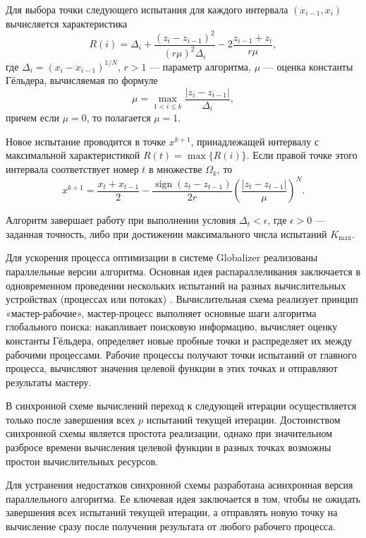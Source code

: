 \documentclass[11pt, oneside, a4paper]{article}
\begin{document}
Для выбора точки следующего испытания для каждого интервала $(x_{i-1}, x_i)$ вычисляется характеристика
\begin{equation}
R(i) = \Delta_i + \frac{(z_i - z_{i-1})^2}{(r\mu)^2\Delta_i} - 2\frac{z_{i-1} + z_i}{r\mu}, \label{eq_R}
\end{equation}
где $\Delta_i = (x_i - x_{i-1})^{1/N}$, $r>1$ --- параметр алгоритма, $\mu$ --- оценка константы Гёльдера, вычисляемая по формуле
\[
\mu = \max_{1 < i \leq k} \frac{|z_i - z_{i-1}|}{\Delta_i},
\]
причем если $\mu = 0$, то полагается $\mu = 1$.

Новое испытание проводится в точке $x^{k+1}$, принадлежащей интервалу с максимальной характеристикой $R(t) = \max\{R(i)\}$. Если правой точке этого интервала соответствует номер $t$ в множестве $\Omega_k$, то
\begin{equation}
x^{k+1} = \frac{x_t + x_{t-1}}{2} - \frac{\operatorname{sign}(z_t - z_{t-1})}{2r} \left( \frac{|z_t - z_{t-1}|}{\mu} \right)^N. \label{eq_x_new}
\end{equation}

Алгоритм завершает работу при выполнении условия $\Delta_t < \epsilon$, где $\epsilon > 0$ — заданная точность, либо при достижении максимального числа испытаний $K_{\max}$.


Для ускорения процесса оптимизации в системе Globalizer реализованы параллельные версии алгоритма. Основная идея распараллеливания заключается в одновременном проведении нескольких испытаний на разных вычислительных устройствах (процессах или потоках) \cite{Lebedev2022, Barkalov2016, globalizerSystem} . Вычислительная схема реализует принцип «мастер-рабочие», мастер-процесс выполняет основные шаги алгоритма глобального поиска: накапливает поисковую информацию, вычисляет оценку константы Гёльдера, определяет новые пробные точки и распределяет их между рабочими процессами. Рабочие процессы получают точки испытаний от главного процесса, вычисляют значения целевой функции в этих точках и отправляют результаты мастеру.

В синхронной схеме вычислений переход к следующей итерации осуществляется только после завершения всех $p$ испытаний текущей итерации. Достоинством синхронной схемы является простота реализации, однако при значительном разбросе времени вычисления целевой функции в разных точках возможны простои вычислительных ресурсов.

Для устранения недостатков синхронной схемы разработана асинхронная версия параллельного алгоритма. Ее ключевая идея заключается в том, чтобы не ожидать завершения всех испытаний текущей итерации, а отправлять новую точку на вычисление сразу после получения результата от любого рабочего процесса.
\end{document}
